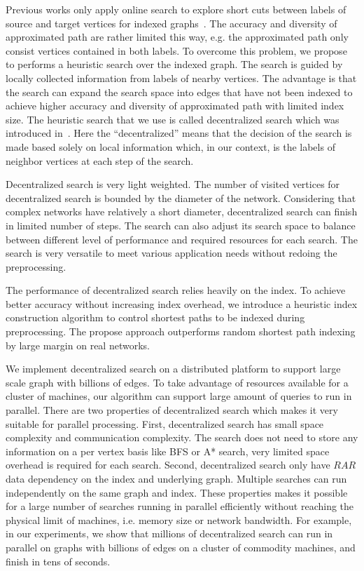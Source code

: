 Previous works only apply online search to explore short cuts between labels of source and target vertices for indexed graphs~\cite{Gubichev:2010:FAE:1871437.1871503, 6399472}. The accuracy and diversity of approximated path are rather limited this way, e.g. the approximated path only consist vertices contained in both labels. To overcome this problem, we propose to performs a heuristic search over the indexed graph. The search is guided by locally collected information from labels of nearby vertices. The advantage is that the search can expand the search space into edges that have not been indexed to achieve higher accuracy and diversity of approximated path with limited index size. The heuristic search that we use is called decentralized search which was introduced in~\cite{Kleinberg:2000p5066, kleinberg2006complex}. Here the "`decentralized"' means that the decision of the search is made based solely on local information which, in our context, is the labels of neighbor vertices at each step of the search.

Decentralized search is very light weighted. The number of visited vertices for decentralized search is bounded by the diameter of the network. Considering that complex networks have relatively a short diameter, decentralized search can finish in limited number of steps. The search can also adjust its search space to balance between different level of performance and required resources for each search. The search is very versatile to meet various application needs without redoing the preprocessing.  

The performance of decentralized search relies heavily on the index. To achieve better accuracy without increasing index overhead, we introduce a heuristic index construction algorithm to control shortest paths to be indexed during preprocessing. The propose approach outperforms random shortest path indexing by large margin on real networks.

We implement decentralized search on a distributed platform to support large scale graph with billions of edges. To take advantage of resources available for a cluster of machines, our algorithm can support large amount of queries to run in parallel. There are two properties of decentralized search which makes it very suitable for parallel processing. First, decentralized search has small space complexity and communication complexity. The search does not need to store any information on a per vertex basis like BFS or A* search, very limited space overhead is required for each search. Second, decentralized search only have $RAR$ data dependency on the index and underlying graph. Multiple searches can run independently on the same graph and index. These properties makes it possible for a large number of searches running in parallel efficiently without reaching the physical limit of machines, i.e. memory size or network bandwidth. For example, in our experiments, we show that millions of decentralized search can run in parallel on graphs with billions of edges on a cluster of commodity machines, and finish in tens of seconds. 

